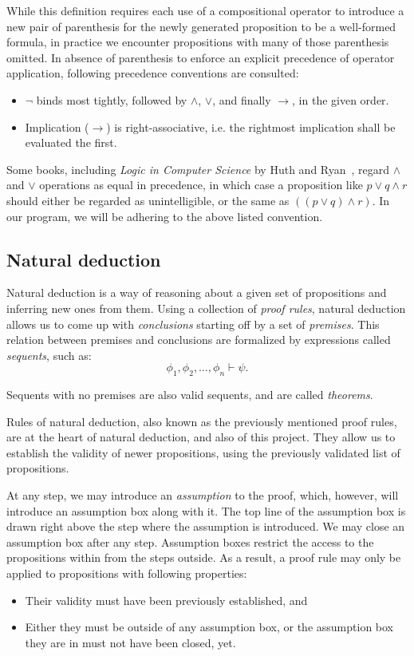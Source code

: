 \documentclass{article}
\newcommand{\imp}{\ensuremath{\rightarrow}}
\begin{document}
While this definition requires each use of a compositional operator
to introduce a new pair of parenthesis for the newly generated
proposition to be a well-formed formula, in practice we encounter
propositions with many of those parenthesis omitted. In absence of
parenthesis to enforce an explicit precedence of operator application,
following precedence conventions are consulted:
\begin{itemize}
	\item $\neg$ binds most tightly, followed by $\land$, $\lor$, and
		finally $\imp$, in the given order.
	\item Implication ($\imp$) is right-associative, i.e. the
		rightmost implication shall be evaluated the first.
\end{itemize}

Some books, including \textit{Logic in Computer Science} by Huth and
Ryan~\cite{huth2004logic},
regard $\land$ and $\lor$ operations as equal in precedence, in which
case a proposition like $p \lor q \land r$ should either be regarded
as unintelligible, or the same as $((p \lor q) \land r)$.
In our program, we will be adhering to the above listed convention.

\subsection{Natural deduction}\label{sec:intr_nd}

Natural deduction is a way of reasoning about a given set of propositions
and inferring new ones from them. Using a collection of \textit{proof rules},
natural deduction allows us to come up with \textit{conclusions} starting
off by a set of \textit{premises}. This relation between premises and
conclusions are formalized by expressions called \textit{sequents},
such as:
$$
\phi_1, \phi_2, \dotsc, \phi_n \vdash \psi.
$$

Sequents with no premises are also valid sequents, and are called
\textit{theorems}.

Rules of natural deduction, also known as the previously mentioned
proof rules, are at the heart of natural deduction, and also of this project.
They allow us to establish the validity of newer propositions,
using the previously validated list of propositions.

At any step, we may introduce an \textit{assumption} to the proof,
which, however, will introduce an assumption box along with it.
The top line of the assumption box is drawn right above the step
where the assumption is introduced. We may close an assumption
box after any step. Assumption boxes restrict the access to the propositions
within from the steps outside. As a result, a proof rule may only be applied to
propositions with following properties:
\begin{itemize}
	\item Their validity must have been previously established, and
	\item Either they must be outside of any assumption box, or the
		assumption box they are in must not have been closed, yet.
\end{itemize}
\end{document}
